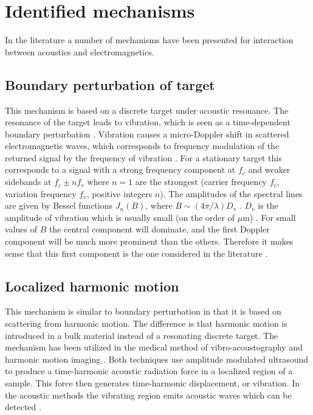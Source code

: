 \documentclass[10pt,a4paper,draft]{scrartcl}
\begin{document}
	\section{Identified mechanisms}
	In the literature a number of mechanisms have been presented for interaction between acoustics and electromagnetics.
	
	\subsection{Boundary perturbation of target}
	This mechanism is based on a discrete target under acoustic resonance. The resonance of the target leads to vibration, which is seen as a time-dependent boundary perturbation \cite{Buerkle2007}. Vibration causes a micro-Doppler shift in scattered electromagnetic waves, which corresponds to frequency modulation of the returned signal by the frequency of vibration \cite{Chen2006}. For a stationary target this corresponds to a signal with a strong frequency component at $f_c$ and weaker sidebands at $f_c \pm n f_v$ where $n=1$ are the strongest (carrier frequency $f_c$, variation frequency $f_v$, positive integers $n$). The amplitudes of the spectral lines are given by Bessel functions $J_n(B)$, where $B \sim (4\pi/\lambda)D_v$ \cite{Chen2006}. $D_v$ is the amplitude of vibration which is usually small (on the order of $\mu$m) \cite{Buerkle2007}\cite{Top2014}. For small values of $B$ the central component will dominate, and the first Doppler component will be much more prominent than the others. Therefore it makes sense that this first component is the one considered in the literature \cite{Buerkle2007}.
	
	\subsection{Localized harmonic motion}
	This mechanism is similar to boundary perturbation in that it is based on scattering from harmonic motion. The difference is that harmonic motion is introduced in a bulk material instead of a resonating discrete target. The mechanism has been utilized in the medical method of vibro-acoustography and harmonic motion imaging \cite{Wang2018}. Both techniques use amplitude modulated ultrasound to produce a time-harmonic acoustic radiation force in a localized region of a sample. This force then generates time-harmonic displacement, or vibration. In the acoustic methods the vibrating region emits acoustic waves which can be detected \cite{Fatemi1998}\cite{Konofagou2003}.
	
\end{document}
